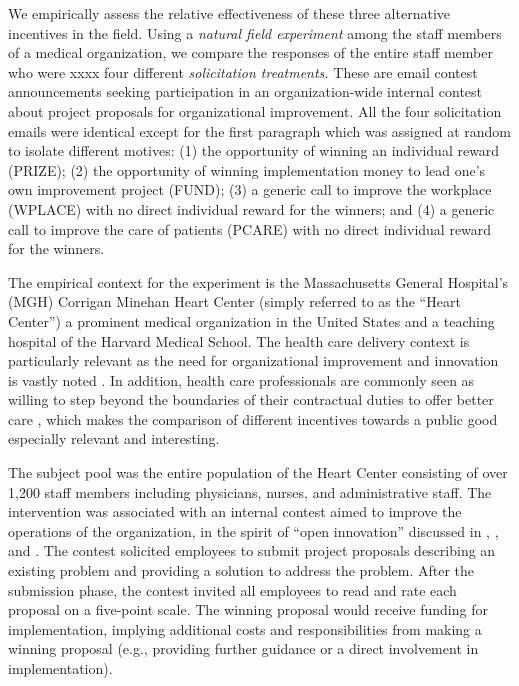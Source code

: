 \documentclass[12pt, titlepage]{article}
\begin{document}
We empirically assess the relative effectiveness of these three
alternative incentives in the field. Using a \emph{natural field
experiment} among the staff members of a medical organization, we
compare the responses of the entire staff member who were xxxx four
different \emph{solicitation treatments.} These are email contest
announcements seeking participation in an organization-wide internal
contest about project proposals for organizational improvement. All the
four solicitation emails were identical except for the first paragraph
which was assigned at random to isolate different motives: (1) the
opportunity of winning an individual reward (PRIZE); (2) the opportunity
of winning implementation money to lead one's own improvement project
(FUND); (3) a generic call to improve the workplace (WPLACE) with no
direct individual reward for the winners; and (4) a generic call to
improve the care of patients (PCARE) with no direct individual reward
for the winners.

The empirical context for the experiment is the Massachusetts General
Hospital's (MGH) Corrigan Minehan Heart Center (simply referred to as
the ``Heart Center'') a prominent medical organization in the United
States and a teaching hospital of the Harvard Medical School. The health
care delivery context is particularly relevant as the need for
organizational improvement and innovation is vastly noted
\citep{cutler2012reducing}. In addition, health care professionals are
commonly seen as willing to step beyond the boundaries of their
contractual duties to offer better care \citep{delfgaauw2005dedicated},
which makes the comparison of different incentives towards a public good
especially relevant and interesting.

The subject pool was the entire population of the Heart Center
consisting of over 1,200 staff members including physicians, nurses, and
administrative staff. The intervention was associated with an internal
contest aimed to improve the operations of the organization, in the
spirit of ``open innovation'' discussed in
\citet{terwiesch2008innovation}, \citet{lakhani2013prize}, and
\citet{glaeser2016predictive}. The contest solicited employees to submit
project proposals describing an existing problem and providing a
solution to address the problem. After the submission phase, the contest
invited all employees to read and rate each proposal on a five-point
scale. The winning proposal would receive funding for implementation,
implying additional costs and responsibilities from making a winning
proposal (e.g., providing further guidance or a direct involvement in
implementation).
\end{document}
